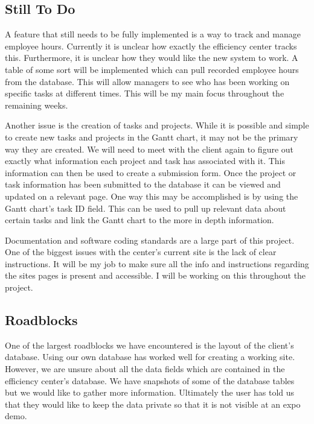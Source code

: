 \documentclass[letterpaper,10pt,titlepage,journal,compsoc,draftclsnofoot,onecolumn]{IEEEtran}
\newcommand\tab[1][1cm]{\hspace*{#1}}
\begin{document}
\subsection{Still To Do}

\tab
A feature that still needs to be fully implemented is a way to track and manage employee hours. Currently it is unclear how exactly the efficiency center tracks this. Furthermore, it is unclear how they would like the new system to work. A table of some sort will be implemented which can pull recorded employee hours from the database. This will allow managers to see who has been working on specific tasks at different times. This will be my main focus throughout the remaining weeks.
\newline

\tab
Another issue is the creation of tasks and projects. While it is possible and simple to create new tasks and projects in the Gantt chart, it may not be the primary way they are created. We will need to meet with the client again to figure out exactly what information each project and task has associated with it. This information can then be used to create a submission form. Once the project or task information has been submitted to the database it can be viewed and updated on a relevant page. One way this may be accomplished is by using the Gantt chart’s task ID field. This can be used to pull up relevant data about certain tasks and link the Gantt chart to the more in depth information.
\newline

\tab
Documentation and software coding standards are a large part of this project. One of the biggest issues with the center’s current site is the lack of clear instructions. It will be my job to make sure all the info and instructions regarding the sites pages is present and accessible. I will be working on this throughout the project.
\newline



\subsection{Roadblocks}

\tab
One of the largest roadblocks we have encountered is the layout of the client’s database. Using our own database has worked well for creating a working site. However, we are unsure about all the data fields which are contained in the efficiency center’s database. We have snapshots of some of the database tables but we would like to gather more information. Ultimately the user has told us that they would like to keep the data private so that it is not visible at an expo demo.
\newline
\end{document}
